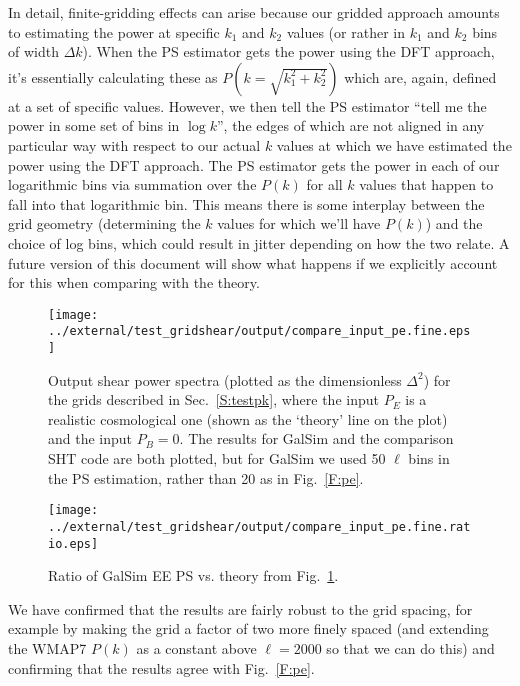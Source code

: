 \documentclass[preprint]{aastex}
\begin{document}
In detail, finite-gridding effects can arise because our gridded
approach amounts to estimating the power at specific $k_1$ and $k_2$
values (or rather in $k_1$ and $k_2$ bins of width $\Delta k$).  When
the PS estimator gets the power using the DFT approach, it's
essentially calculating these as $P(k=\sqrt{k_1^2 +k_2^2})$ which are,
again, defined at a set of specific values.  However, we then tell the
PS estimator ``tell me the power in some set of bins in $\log{k}$'', the
edges of which are not aligned in any particular way with respect to
our actual $k$ values at which we have estimated the power using the DFT
approach.  The PS estimator gets the power in each of our logarithmic
bins via summation over the $P(k)$ for all $k$ values that happen to fall
into that logarithmic bin.  This means there is some interplay between
the grid geometry (determining the $k$ values for which we'll have $P(k)$)
and the choice of log bins, which could result in jitter depending on
how the two relate.  A future version of this document will show what
happens if we explicitly account for this when comparing with the
theory.
\begin{figure}
\begin{center}
\texttt{[image: ../external/test\_gridshear/output/compare\_input\_pe.fine.eps]}
\caption{Output shear power spectra (plotted as the dimensionless
  $\Delta^2$) for the grids described in Sec.~\ref{S:testpk}, where
  the input $P_E$ is a realistic cosmological one (shown as the `theory' line on
  the plot) and the input $P_B=0$. The results for GalSim and the
  comparison SHT code are both plotted, but for GalSim we used 50
  $\ell$ bins in the PS estimation, rather than 20 as in Fig.~\ref{F:pe}.\label{F:pe-fine}}
\end{center}
\end{figure}
\begin{figure}
\begin{center}
\texttt{[image: ../external/test\_gridshear/output/compare\_input\_pe.fine.ratio.eps]}
\caption{Ratio of GalSim EE PS vs. theory from Fig.~\ref{F:pe-fine}.\label{F:pe-fine-ratio}}
\end{center}
\end{figure}

We have confirmed that the results are fairly robust to the grid
spacing, for example by making the grid a factor of two more finely
spaced (and extending the WMAP7 $P(k)$ as a constant above $\ell=2000$
so that we can do this) and confirming that the results agree with
Fig.~\ref{F:pe}.
\end{document}
